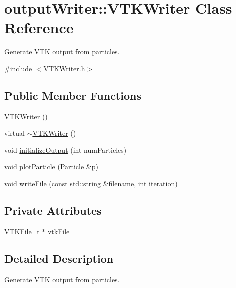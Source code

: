 \hypertarget{classoutputWriter_1_1VTKWriter}{\section{output\-Writer\-:\-:V\-T\-K\-Writer Class Reference}
\label{classoutputWriter_1_1VTKWriter}
}


Generate V\-T\-K output from particles.  




{\ttfamily \#include $<$V\-T\-K\-Writer.\-h$>$}

\subsection*{Public Member Functions}
\begin{DoxyCompactItemize}
\item 
\hyperlink{classoutputWriter_1_1VTKWriter_a448311c322544e40c6e0a3c158924583}{V\-T\-K\-Writer} ()
\item 
virtual \hyperlink{classoutputWriter_1_1VTKWriter_a196a54bcfa3f93638ef292c386f91b61}{$\sim$\-V\-T\-K\-Writer} ()
\item 
void \hyperlink{classoutputWriter_1_1VTKWriter_a41cfcefce4d7eb434f1dd45f5aeb3e8f}{initialize\-Output} (int num\-Particles)
\item 
void \hyperlink{classoutputWriter_1_1VTKWriter_a6d3f50ca3ae2390055d3f9cc0ed1eb4d}{plot\-Particle} (\hyperlink{classParticle}{Particle} \&p)
\item 
void \hyperlink{classoutputWriter_1_1VTKWriter_ad0d7afb78a2027d05e9a03acde3799dd}{write\-File} (const std\-::string \&filename, int iteration)
\end{DoxyCompactItemize}
\subsection*{Private Attributes}
\begin{DoxyCompactItemize}
\item 
\hyperlink{classVTKFile__t}{V\-T\-K\-File\-\_\-t} $\ast$ \hyperlink{classoutputWriter_1_1VTKWriter_ab654ea4308b92e5dbdcd9a6833d5ed30}{vtk\-File}
\end{DoxyCompactItemize}


\subsection{Detailed Description}
Generate V\-T\-K output from particles. 


